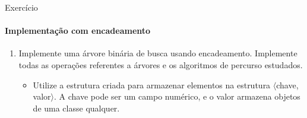 \begin{frame}{Exercício}
\framesubtitle{Implementação com encadeamento}
\begin{enumerate}
	\item Implemente uma árvore binária de busca usando encadeamento. Implemente todas as operações referentes a árvores e os algoritmos de percurso estudados.
	\begin{itemize}
		\item Utilize a estrutura criada para armazenar elementos na estrutura $\langle$chave, valor$\rangle$. A chave pode ser um campo numérico, e o valor armazena objetos de uma classe qualquer.
	\end{itemize}
\end{enumerate}
\end{frame}

%	


